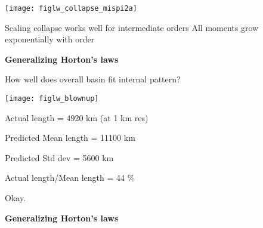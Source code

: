 \begin{frame}[label=]
\begin{frame}[label=]
\begin{frame}[label=]
\begin{frame}[label=]
\begin{frame}[label=]
\begin{frame}[label=]
\begin{frame}[label=]
\begin{frame}[label=]
\begin{frame}[label=]
\begin{frame}[label=]
\begin{frame}[label=]
\begin{frame}[label=]
\begin{frame}[label=]
\begin{frame}[label=]
\begin{frame}[label=]
\begin{frame}[label=]
\begin{frame}[label=]
\begin{frame}[label=]
\begin{frame}[label=]
\begin{frame}[label=]
\begin{frame}[label=]
\begin{frame}[label=]
\begin{frame}[label=]
\begin{frame}[label=]
\begin{frame}[label=]
\begin{frame}[label=]
\begin{frame}[label=]
\begin{frame}[label=]
\begin{frame}[label=]
\begin{frame}[label=]
\begin{frame}[label=]
\begin{frame}[label=]
\begin{frame}[label=]
\begin{frame}[label=]
\begin{frame}[label=]
\begin{frame}[label=]
\begin{frame}[label=]
\begin{frame}[label=]
\begin{frame}[label=]
\begin{frame}[label=]
\begin{frame}[label=]
\begin{frame}[label=]
\begin{frame}[label=]
      \texttt{[image: figlw\_collapse\_mispi2a]}
      
  
   Scaling collapse works well for intermediate orders
   All \alert{moments} grow exponentially with order
  
  

\begin{frame}[label=]
  \textbf{Generalizing Horton's laws}

  
   How well does overall basin fit internal pattern?
  
      
    \texttt{[image: figlw\_blownup]}    
    
    
    
      Actual length = \alert{4920 km} (at 1 km res)
    
      Predicted Mean length = \alert{11100 km}
    
      Predicted Std dev = \alert{5600 km}
    
      Actual length/Mean length = \alert{44 \%}
    
      Okay.
    
  

\begin{frame}[label=]
  \textbf{Generalizing Horton's laws}


\end{frame}
\end{frame}
\end{frame}
\end{frame}
\end{frame}
\end{frame}
\end{frame}
\end{frame}
\end{frame}
\end{frame}
\end{frame}
\end{frame}
\end{frame}
\end{frame}
\end{frame}
\end{frame}
\end{frame}
\end{frame}
\end{frame}
\end{frame}
\end{frame}
\end{frame}
\end{frame}
\end{frame}
\end{frame}
\end{frame}
\end{frame}
\end{frame}
\end{frame}
\end{frame}
\end{frame}
\end{frame}
\end{frame}
\end{frame}
\end{frame}
\end{frame}
\end{frame}
\end{frame}
\end{frame}
\end{frame}
\end{frame}
\end{frame}
\end{frame}
\end{frame}
\end{frame}
